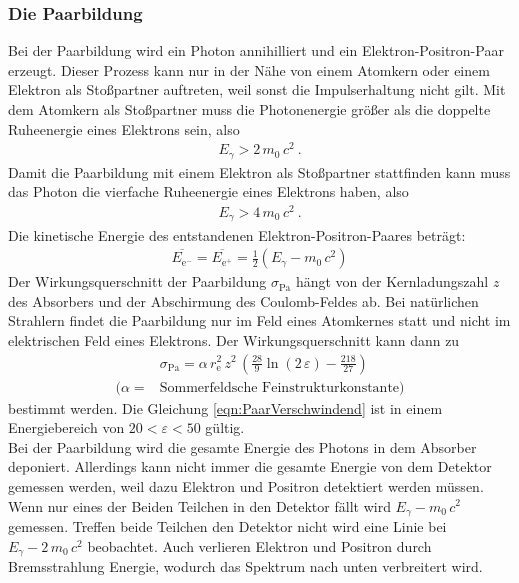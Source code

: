 \subsubsection{Die Paarbildung}
Bei der Paarbildung wird ein Photon annihilliert und ein Elektron-Positron-Paar erzeugt. Dieser Prozess kann nur in der Nähe von einem Atomkern oder einem Elektron als Stoßpartner auftreten, weil sonst die Impulserhaltung nicht gilt. Mit dem Atomkern als Stoßpartner muss die Photonenergie größer als die doppelte Ruheenergie eines Elektrons sein, also
\begin{align*}
	E_{\gamma} > 2\,m_0\,c^2 \ .
\end{align*}
Damit die Paarbildung mit einem Elektron als Stoßpartner stattfinden kann muss das Photon die vierfache Ruheenergie eines Elektrons haben, also
\begin{align*}
	E_{\gamma} > 4\,m_0\,c^2 \ .
\end{align*}
Die kinetische Energie des entstandenen Elektron-Positron-Paares beträgt:
\begin{align}
	\overline{E_{\text{e}^-}} = \overline{E_{\text{e}^+}} = \frac{1}{2}(E_{\gamma} - m_0\,c^2)
\end{align}
Der Wirkungsquerschnitt der Paarbildung $\sigma_\text{Pa}$ hängt von der Kernladungszahl $z$ des Absorbers und der Abschirmung des Coulomb-Feldes ab. Bei natürlichen Strahlern findet die Paarbildung nur im Feld eines Atomkernes statt und nicht im elektrischen Feld eines Elektrons. Der Wirkungsquerschnitt kann dann zu
\begin{align}
	&\sigma_\text{Pa} = \alpha\, r_\text{e}^2\, z^2\, \left(\frac{28}{9}\ln(2\,\varepsilon) - \frac{218}{27} \right) \\
	(\alpha = &\text{Sommerfeldsche Feinstrukturkonstante})
	\label{eqn:PaarVerschwindend}
\end{align}
bestimmt werden. Die Gleichung \eqref{eqn:PaarVerschwindend} ist in einem Energiebereich von $20 < \varepsilon < 50$ gültig.  \\
Bei der Paarbildung wird die gesamte Energie des Photons in dem Absorber deponiert. Allerdings kann nicht immer die gesamte Energie von dem Detektor gemessen werden, weil dazu Elektron und Positron detektiert werden müssen. Wenn nur eines der Beiden Teilchen in den Detektor fällt wird $E_\gamma - m_0\,c^2$ gemessen. Treffen beide Teilchen den Detektor nicht wird eine Linie bei $E_\gamma - 2\,m_0\,c^2$ beobachtet. Auch verlieren Elektron und Positron durch Bremsstrahlung Energie, wodurch das Spektrum nach unten verbreitert wird. 



